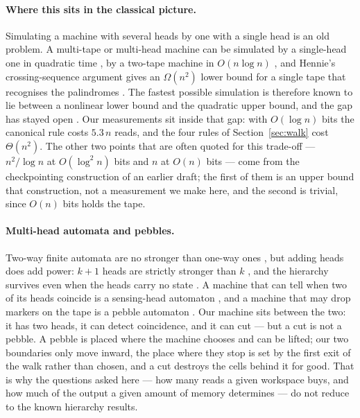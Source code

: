 \documentclass[11pt]{article}
\begin{document}
\paragraph{Where this sits in the classical picture.} Simulating a machine with several heads by one
with a single head is an old problem. A multi-tape or multi-head machine can be simulated by a
single-head one in quadratic time \citep{hartmanis-stearns1965}, by a two-tape machine in
$O(n\log n)$ \citep{hennie-stearns1966}, and Hennie's crossing-sequence argument gives an
$\Omega(n^2)$ lower bound for a single tape that recognises the palindromes
\citep{hennie1965}. The fastest possible simulation is therefore known to lie between a nonlinear
lower bound and the quadratic upper bound, and the gap has stayed open
\citep{kutrib2010}. Our measurements sit inside that gap: with $O(\log n)$ bits the canonical rule costs $5.3\,n$ reads,
and the four rules of Section~\ref{sec:walk} cost $\Theta(n^2)$. The other two points that are often
quoted for this trade-off --- $n^2/\log n$ at $O(\log^2 n)$ bits and $n$ at $O(n)$ bits --- come from
the checkpointing construction of an earlier draft; the first of them is an upper bound that
construction, not a measurement we make here, and the second is trivial, since $O(n)$ bits holds the
tape.

\paragraph{Multi-head automata and pebbles.} Two-way finite automata are no stronger than one-way
ones \citep{rabin-scott1959}, but adding heads does add power: $k+1$ heads are strictly stronger than
$k$ \citep{rosenberg1966}, and the hierarchy survives even when the heads carry no state
\citep{kutrib-malcher2009}. A machine that can tell when two of its heads coincide is a sensing-head
automaton \citep{petersen1995}, and a machine that may drop markers on the tape is a pebble automaton
\citep{blum-hewitt1967}. Our machine sits between the two: it has two heads, it can detect coincidence,
and it can cut --- but a cut is not a pebble. A pebble is placed where the machine chooses and can be
lifted; our two boundaries only move inward, the place where they stop is set by the first exit of the
walk rather than chosen, and a cut destroys the cells behind it for good. That is why the questions
asked here --- how many reads a given workspace buys, and how much of the output a given amount of
memory determines --- do not reduce to the known hierarchy results.
\end{document}

